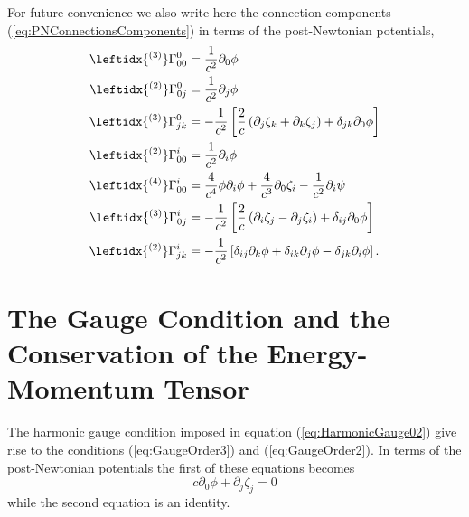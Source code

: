 For future convenience  we also write here the connection components (\ref{eq:PNConnectionsComponents}) in terms of the post-Newtonian potentials,
\begin{subequations} 
\begin{align}
\leftidx{^{(3)}}\Gamma ^0_{00} &=  \frac{1}{c^2} \partial _0 \phi\\
\leftidx{^{(2)}}\Gamma ^0_{0j} &=  \frac{1}{c^2} \partial _j \phi \\
\leftidx{^{(3)}}\Gamma ^0_{jk} &=  -\frac{1}{c^2} \left[ \frac{2}{c}\left( \partial _j \zeta_k + \partial _k \zeta_j \right) + \delta_{jk} \partial _0 \phi \right] \\
\leftidx{^{(2)}}\Gamma ^i_{00} &=  \frac{1}{c^2} \partial _i \phi \\
\leftidx{^{(4)}}\Gamma ^i_{00} &=  \frac{4}{c^4} \phi \partial _i \phi + \frac{4}{c^3} \partial _0 \zeta_i - \frac{1}{c^2} \partial _i \psi  \\
\leftidx{^{(3)}}\Gamma ^i_{0j} &= - \frac{1}{c^2} \left[ \frac{2}{c}\left( \partial _i \zeta_j - \partial _j \zeta_i \right) + \delta_{ij} \partial _0 \phi \right]\\
\leftidx{^{(2)}}\Gamma ^i_{jk} &= - \frac{1}{c^2} \left[ \delta_{ij}\partial _k \phi  + \delta_{ik} \partial _j \phi - \delta_{jk}  \partial _i \phi \right].
\end{align}
\end{subequations}

\section{The Gauge Condition and the Conservation of the Energy-Momentum Tensor}

The harmonic gauge condition imposed in equation (\ref{eq:HarmonicGauge02}) give rise to the conditions (\ref{eq:GaugeOrder3}) and (\ref{eq:GaugeOrder2}). In terms of the post-Newtonian potentials the first of these equations becomes
\begin{equation}
 c \partial_0 \phi + \partial_j \zeta_j  = 0\label{eq:GaugeinPotentials}
 \end{equation} 
while the second equation is an identity.

